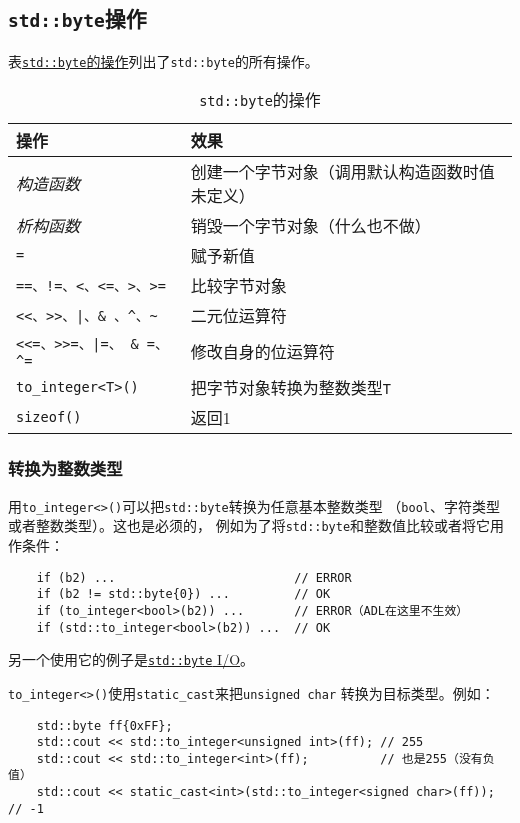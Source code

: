 \subsection{\texttt{std::byte}操作}
表\hyperref[t18.1]{\texttt{std::byte}的操作}列出了\texttt{std::byte}的所有操作。
\begin{table}[htb]
    \centering
    \begin{tabular}{l|l}
        \hline
        \textbf{操作} & \textbf{效果} \\
        \hline
        \emph{构造函数} & 创建一个字节对象（调用默认构造函数时值未定义） \\
        \emph{析构函数} & 销毁一个字节对象（什么也不做） \\
        \texttt{=} & 赋予新值 \\
        \texttt{==、!=、<、<=、>、>=} & 比较字节对象 \\
        \texttt{<<、>>、|、\& 、\textasciicircum、\textasciitilde} & 二元位运算符    \\
        \texttt{<<=、>>=、|=、 \& =、\textasciicircum =}              & 修改自身的位运算符 \\
        \texttt{to\_integer<T>()} & 把字节对象转换为整数类型\texttt{T} \\
        \texttt{sizeof()} & 返回1 \\
        \hline
    \end{tabular}
    \caption{\texttt{std::byte}的操作}
    \label{t18.1}
\end{table}

\subsubsection{转换为整数类型}
用\texttt{to\_integer<>()}可以把\texttt{std::byte}转换为任意基本整数类型
（\texttt{bool}、字符类型或者整数类型）。这也是必须的，
例如为了将\texttt{std::byte}和整数值比较或者将它用作条件：
\begin{lstlisting}
    if (b2) ...                         // ERROR
    if (b2 != std::byte{0}) ...         // OK
    if (to_integer<bool>(b2)) ...       // ERROR（ADL在这里不生效）
    if (std::to_integer<bool>(b2)) ...  // OK
\end{lstlisting}
另一个使用它的例子是\hyperref[ch18.2.2.2]{\texttt{std::byte} I/O}。

\texttt{to\_integer<>()}使用\texttt{static\_cast}来把\texttt{unsigned char}
转换为目标类型。例如：
\begin{lstlisting}
    std::byte ff{0xFF};
    std::cout << std::to_integer<unsigned int>(ff); // 255
    std::cout << std::to_integer<int>(ff);          // 也是255（没有负值）
    std::cout << static_cast<int>(std::to_integer<signed char>(ff)); // -1
\end{lstlisting}


